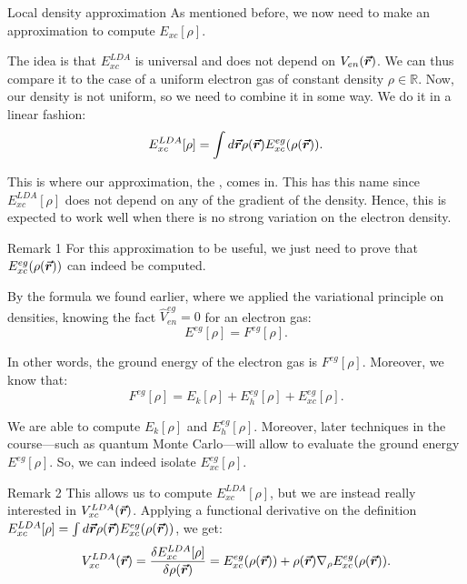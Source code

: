 \documentclass[a4paper]{article}
\begin{document}
\begin{parag}{Local density approximation}
    As mentioned before, we now need to make an approximation to compute $E_{xc}\left[\rho\right]$.

    The idea is that $E_{xc}^{LDA}$ is universal and does not depend on $V_{en}\left(\bvec{r}\right)$. We can thus compare it to the case of a uniform electron gas of constant density $\rho \in \mathbb{R}$. Now, our density is not uniform, so we need to combine it in some way. We do it in a linear fashion:
    \[E_{xc}^{LDA}\left[\rho\right] = \int d \bvec{r} \rho\left(\bvec{r}\right) E_{xc}^{eg}\left(\rho\left(\bvec{r}\right)\right).\]

    This is where our approximation, the , comes in. This has this name since $E_{xc}^{LDA}\left[\rho\right]$ does not depend on any of the gradient of the density. Hence, this is expected to work well when there is no strong variation on the electron  density.

    \begin{subparag}{Remark 1}
        For this approximation to be useful, we just need to prove that $E_{xc}^{eg}\left(\rho\left(\bvec{r}\right)\right)$ can indeed be computed.

        By the formula we found earlier, where we applied the variational principle on densities, knowing the fact $\hat{V}_{en}^{eg} = 0$ for an electron gas:
        \[E^{eg}\left[\rho\right] = F^{eg}\left[\rho\right].\]

        In other words, the ground energy of the electron gas is $F^{eg}\left[\rho\right]$. Moreover, we know that:
        \[F^{eg}\left[\rho\right] = E_k\left[\rho\right] + E_h^{eg}\left[\rho\right] + E_{xc}^{eg}\left[\rho\right].\]

        We are able to compute $E_k\left[\rho\right]$ and $E_h^{eg}\left[\rho\right]$. Moreover, later techniques in the course---such as quantum Monte Carlo---will allow to evaluate the ground energy $E^{eg}\left[\rho\right]$. So, we can indeed isolate $E_{xc}^{eg}\left[\rho\right]$.
    \end{subparag}

    \begin{subparag}{Remark 2}
        This allows us to compute $E_{xc}^{LDA}\left[\rho\right]$, but we are instead really interested in $V_{xc}^{LDA}\left(\bvec{r}\right)$. Applying a functional derivative on the definition $E_{xc}^{LDA}\left[\rho\right] = \int d \bvec{r} \rho\left(\bvec{r}\right) E_{xc}^{eg}\left(\rho\left(\bvec{r}\right)\right)$, we get:
        \[V_{xc}^{LDA}\left(\bvec{r}\right) = \frac{\delta E_{xc}^{LDA}\left[\rho\right]}{\delta \rho\left(\bvec{r}\right)} = E_{xc}^{eg}\left(\rho\left(\bvec{r}\right)\right) + \rho\left(\bvec{r}\right) \nabla_{\rho} E_{xc}^{eg}\left(\rho\left(\bvec{r}\right)\right).\]


\end{subparag}
\end{parag}
\end{document}

